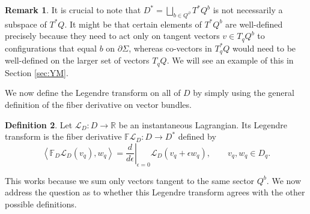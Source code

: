 \documentclass{article}
\theoremstyle{definition}
\newtheorem{definition}{Definition}[section]
\newtheorem{remark}[definition]{Remark}
\begin{document}
\begin{remark}\label{boundaryremark}
    It is crucial to note that $D^*=\bigsqcup_{b\in Q^\partial} T^*Q^b$ is not necessarily a subspace of $T^*Q$. It might be that certain elements of $T^*Q^b$ are well-defined precisely because they need to act only on tangent vectors $v\in T_q Q^b$ to configurations that equal $b$ on $\partial\Sigma$, whereas co-vectors in $T_q^*Q$ would need to be well-defined on the larger set of vectors $T_qQ$. We will see an example of this in Section \ref{sec:YM}.
\end{remark}

We now define the Legendre transform on all of $D$ by simply using the general definition of the fiber derivative on vector bundles.

\begin{definition}
Let \(\mathcal{L}_D\colon D\to\mathbb R\) be an instantaneous Lagrangian. Its Legendre
transform is the fiber derivative $\mathbb{F}\mathcal{L}_D\colon D\to D^*$
defined by
\[
\left\langle \mathbb F_D \mathcal L_D(v_q),w_q\right\rangle
=
\left.\frac{d}{d\epsilon}\right|_{\epsilon=0}
\mathcal L_D(v_q+\epsilon w_q),
\qquad
v_q,w_q\in D_q.
\]
\end{definition}

This works because we sum only vectors tangent to the same sector $Q^b$. We now address the question as to whether this Legendre transform agrees with the other possible definitions.
\end{document}
